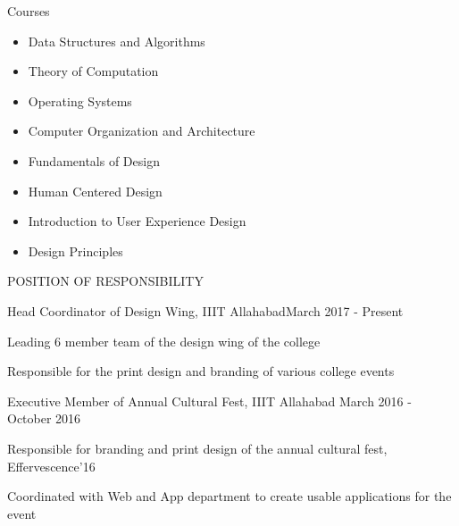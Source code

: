 \documentclass{resume} %
\begin{document}
\begin{rSection}{Courses}\itemsep -3pt 

\begin{multicols}{2}
    \begin{itemize}
        \item Data Structures and Algorithms
        \item Theory of Computation
        \item Operating Systems
        \item Computer Organization and Architecture
        \item Fundamentals of Design
        \item Human Centered Design
        \item Introduction to User Experience Design
        \item Design Principles
    \end{itemize}
    \end{multicols}

\end{rSection}  
 
  
\begin{rSection}{POSITION OF RESPONSIBILITY}

\begin{rSubsection}{Head Coordinator of Design Wing, IIIT Allahabad}{March 2017 - Present}{}{}           
\item Leading 6 member team of the design wing of the college
\item Responsible for the print design and branding of various college events 
\end{rSubsection}  


\begin{rSubsection}{Executive Member of Annual Cultural Fest, IIIT Allahabad} {March 2016 - October 2016}{}{} 
\item Responsible for branding and print design of the annual cultural fest, Effervescence'16            
\item Coordinated with Web and App department to create usable applications for the event
\end{rSubsection}

\end{rSection}
  
\end{document}
